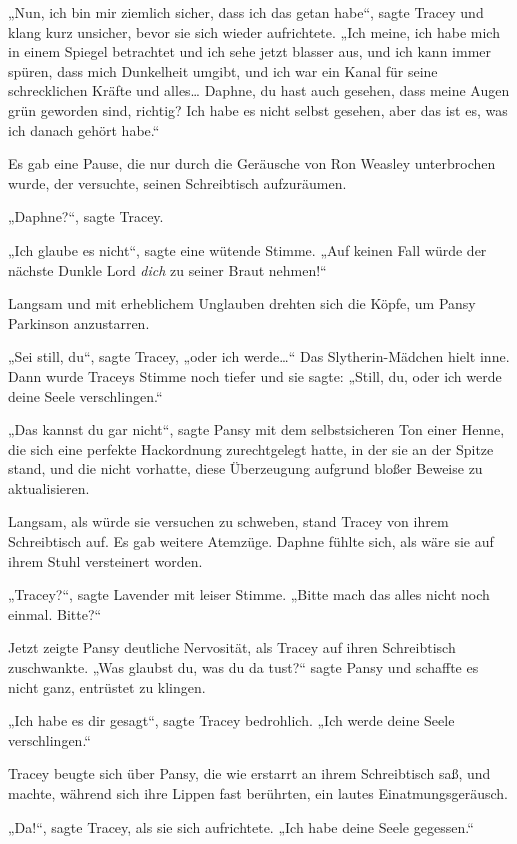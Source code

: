 {„Nun, ich bin mir ziemlich sicher, dass ich das getan habe“, sagte Tracey und klang kurz unsicher, bevor sie sich wieder aufrichtete. „Ich meine, ich habe mich in einem Spiegel betrachtet und ich sehe jetzt blasser aus, und ich kann immer spüren, dass mich Dunkelheit umgibt, und ich war ein Kanal für seine schrecklichen Kräfte und alles… Daphne, du hast auch gesehen, dass meine Augen grün geworden sind, richtig? Ich habe es nicht selbst gesehen, aber das ist es, was ich danach gehört habe.“

Es gab eine Pause, die nur durch die Geräusche von Ron Weasley unterbrochen wurde, der versuchte, seinen Schreibtisch aufzuräumen.

„Daphne?“, sagte Tracey.

„Ich glaube es nicht“, sagte eine wütende Stimme. „Auf keinen Fall würde der nächste Dunkle Lord \emph{dich} zu seiner Braut nehmen!“

Langsam und mit erheblichem Unglauben drehten sich die Köpfe, um Pansy Parkinson anzustarren.

„Sei still, du“, sagte Tracey, „oder ich werde…“ Das Slytherin-Mädchen hielt inne. Dann wurde Traceys Stimme noch tiefer und sie sagte: „Still, du, oder ich werde deine Seele verschlingen.“

„Das kannst du gar nicht“, sagte Pansy mit dem selbstsicheren Ton einer Henne, die sich eine perfekte Hackordnung zurechtgelegt hatte, in der sie an der Spitze stand, und die nicht vorhatte, diese Überzeugung aufgrund bloßer Beweise zu aktualisieren.

Langsam, als würde sie versuchen zu schweben, stand Tracey von ihrem Schreibtisch auf. Es gab weitere Atemzüge. Daphne fühlte sich, als wäre sie auf ihrem Stuhl versteinert worden.

„Tracey?“, sagte Lavender mit leiser Stimme. „Bitte mach das alles nicht noch einmal. Bitte?“

Jetzt zeigte Pansy deutliche Nervosität, als Tracey auf ihren Schreibtisch zuschwankte. „Was glaubst du, was du da tust?“ sagte Pansy und schaffte es nicht ganz, entrüstet zu klingen.

„Ich habe es dir gesagt“, sagte Tracey bedrohlich. „Ich werde deine Seele verschlingen.“

Tracey beugte sich über Pansy, die wie erstarrt an ihrem Schreibtisch saß, und machte, während sich ihre Lippen fast berührten, ein lautes Einatmungsgeräusch.

„Da!“, sagte Tracey, als sie sich aufrichtete. „Ich habe deine Seele gegessen.“

}
